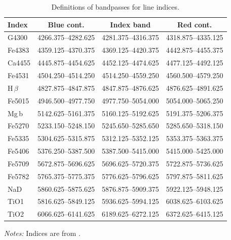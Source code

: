 		 	\begin{table}
				\centering
			\begin{threeparttable}
				\caption{Definitions of bandpasses for line indices.}
				\label{tab:abIndex}
				\begin{tabular}{l c c c}
					\hline
					\hline
					Index 	& Blue cont. 		& Index band 		& Red cont. \\
					\hline 
					G4300 	& 4266.375--4282.625 & 4281.375--4316.375 & 4318.875--4335.125 \\
					Fe4383 	& 4359.125--4370.375 & 4369.125--4420.375 & 4442.875--4455.375 \\
					Ca4455 	& 4445.875--4454.625 & 4452.125--4474.625 & 4477.125--4492.125 \\
					Fe4531 	& 4504.250--4514.250 & 4514.250--4559.250 & 4560.500--4579.250 \\
					H\,$\beta$ & 4827.875--4847.875 & 4847.875--4876.625 & 4876.625--4891.625 \\
					Fe5015 	& 4946.500--4977.750 & 4977.750--5054.000 & 5054.000--5065.250 \\
					Mg\,b 	& 5142.625--5161.375 & 5160.125--5192.625 & 5191.375--5206.375 \\
					Fe5270 	& 5233.150--5248.150 & 5245.650--5285.650 & 5285.650--5318.150 \\
					Fe5335 	& 5304.625--5315.875 & 5312.125--5352.125 & 5353.375--5363.375 \\
					Fe5406 	& 5376.250--5387.500 & 5387.500--5415.000 & 5415.000--5425.000 \\
					Fe5709 	& 5672.875--5696.625 & 5696.625--5720.375 & 5722.875--5736.625 \\
					Fe5782 	& 5765.375--5775.375 & 5776.625--5796.625 & 5797.875--5811.625 \\
					NaD 	& 5860.625--5875.625 & 5876.875--5909.375 & 5922.125--5948.125 \\
					TiO1 	& 5816.625--5849.125 & 5936.625--5994.125 & 6038.625--6103.625 \\
					TiO2 	& 6066.625--6141.625 & 6189.625--6272.125 & 6372.625--6415.125 \\
					\hline
					\hline
				\end{tabular}
				\begin{tablenotes}
				\footnotesize
				\item \textit{Notes:} Indices are from \citet{Trager1998}.
				\end{tablenotes}
			\end{threeparttable}
			\end{table}

